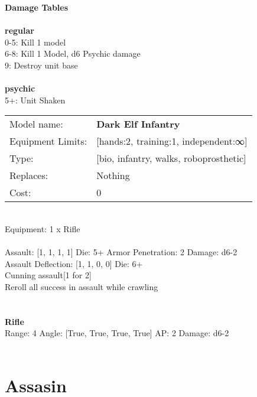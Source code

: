 {\bf Damage Tables} \\
\ \\ {\bf regular } \\
0-5: Kill 1 model \\
6-8: Kill 1 Model, d6 Psychic damage \\
9: Destroy unit base \\
\ \\ {\bf psychic } \\
5+: Unit Shaken \\


\noindent
\begin{tabular}{ll}
Model name: &{\bf Dark Elf Infantry } \\
Equipment Limits: &[hands:2, training:1, independent:∞] \\
Type: &[bio, infantry, walks, roboprosthetic] \\
Replaces: &Nothing \\
Cost: & 0\\
\end{tabular}
\ \\
Equipment: 1 x Rifle \\
\ \\
Assault: [1, 1, 1, 1] Die: 5+ Armor Penetration: 2 Damage: d6-2 \\
Assault Deflection: [1, 1, 0, 0] Die: 6+\\
\indent Cunning assault[1 for 2]\\ 
Reroll all success in assault while crawling\\ 
 
\ \\

\ \\
{\bf Rifle } \\



Range: 4  Angle: [True, True, True, True] AP: 2 Damage: d6-2 \\




 
\ \\













\clearpage

\section{ Assasin }

